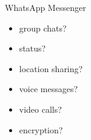 \begin{frame}{\insertsubsection}
\begin{fancycolumns}
\begin{example}{WhatsApp Messenger}
			\begin{fancycolumns}[animation=none]
				\begin{itemize}
					\item group chats?
					\item status?
					\item location sharing?
				\end{itemize}
				\nextcolumn
				\begin{itemize}
					\item voice messages?
					\item video calls?
					\item encryption?
				\end{itemize}
			\end{fancycolumns}
		\end{example}
	\end{fancycolumns}
\end{frame}


